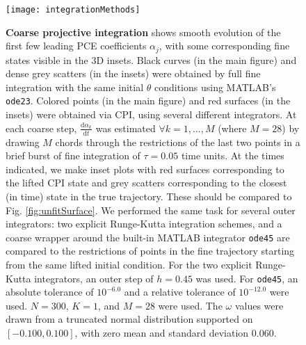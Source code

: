 \documentclass[numbers]{frontiersSCNS}
\newcommand{\diff}{\mathrm{d}}  %
\newcommand{\couplingK}{{K}}
\newcommand{\numCofs}{{M}}
\newcommand{\figRef}[1]{Fig. \ref{fig:#1}}
\newcommand{\scalarFuncIndex}{k}
\DeclareRobustCommand{\inTstep}{\tau}
\DeclareRobustCommand{\outTstep}{h}
\newcommand{\numCofsVal}{28}
\newcommand{\defaultKVal}{1}
\newcommand{\KuramotoCPItStepVal}{0.45}
\newcommand{\KuramotoCPIatollogTenVal}{-6.0}
\newcommand{\KuramotoCPIrtollogTenVal}{-12.0}
\newcommand{\flowTimeVal}{0.05}
\newcommand{\hiOmVal}{0.100}
\newcommand{\omStdVal}{0.060}
\newcommand{\cpiNval}{300}
\begin{document}
\setcounter{subfigure}{0}\begin{figure}[ht]
\centering
%
\texttt{[image: integrationMethods]}
\caption{
    \textbf{Coarse projective integration} shows smooth evolution of the first few leading
    PCE coefficients $\alpha_{j}$,
    with some corresponding fine states visible in the 3D insets.
    Black curves (in the main figure) and dense grey scatters (in the insets) were obtained by full fine integration
    with the same initial $\theta$ conditions using MATLAB's \texttt{ode23}.
    Colored points (in the main figure) and red surfaces (in the insets) were obtained via CPI,
    using several different integrators.
    At each coarse step, $\frac{\diff \alpha_{\scalarFuncIndex}}{\diff t}$ was estimated
    $\forall {\scalarFuncIndex}=1,\ldots,\numCofs$
    (where $\numCofs = \numCofsVal$)
    by drawing $\numCofs$ chords through the restrictions of the last two points
    in a brief burst of fine integration of ${\inTstep} = \flowTimeVal$ time units.
    At the times indicated,
    we make inset plots with red surfaces corresponding to the lifted CPI state
    and grey scatters corresponding to the closest (in time) state in the true trajectory.
    These should  be compared to \figRef{unfitSurface}.
    We performed the same task for several outer integrators:
    two explicit Runge-Kutta integration schemes,
    and a coarse wrapper around the built-in MATLAB integrator \texttt{ode45}
    are compared to the restrictions
    of points in the fine trajectory starting from the same lifted initial condition.
    For the two explicit Runge-Kutta integrators,
    an outer step of
    $\outTstep=\KuramotoCPItStepVal$
    was used.
    For \texttt{ode45}, an absolute
    tolerance of $10^{\KuramotoCPIatollogTenVal}$
    and a relative 
    tolerance of $10^{\KuramotoCPIrtollogTenVal}$
    were used.
    $N=\cpiNval$, $\couplingK=\defaultKVal$, and $\numCofs=\numCofsVal$ were used.
    The $\omega$ values were drawn from a truncated normal distribution
    supported on $[-\hiOmVal, \hiOmVal]$, with zero mean and standard deviation $\omStdVal$.
    }
\label{fig:cpiResults}
\end{figure}
%
%
%
\end{document}
